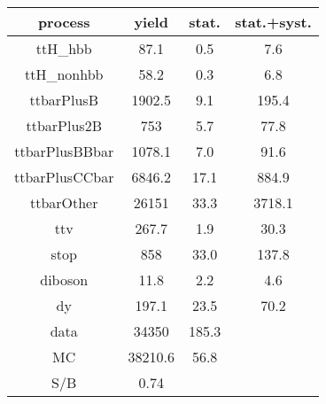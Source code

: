 \begin{tabular}{cccc}
\hline
    process     &  yield  &  stat.  &  stat.+syst.  \\
\hline
    ttH\_hbb     &  87.1   &   0.5   &      7.6      \\
   ttH\_nonhbb   &  58.2   &   0.3   &      6.8      \\
   ttbarPlusB   & 1902.5  &   9.1   &     195.4     \\
  ttbarPlus2B   &   753   &   5.7   &     77.8      \\
 ttbarPlusBBbar & 1078.1  &   7.0   &     91.6      \\
 ttbarPlusCCbar & 6846.2  &  17.1   &     884.9     \\
   ttbarOther   &  26151  &  33.3   &    3718.1     \\
      ttv       &  267.7  &   1.9   &     30.3      \\
      stop      &   858   &  33.0   &     137.8     \\
    diboson     &  11.8   &   2.2   &      4.6      \\
       dy       &  197.1  &  23.5   &     70.2      \\
\hline
      data      &  34350  &  185.3  &               \\
       MC       & 38210.6 &  56.8   &               \\
\hline
      S/B       &  0.74   &         &               \\
\hline
\end{tabular}
